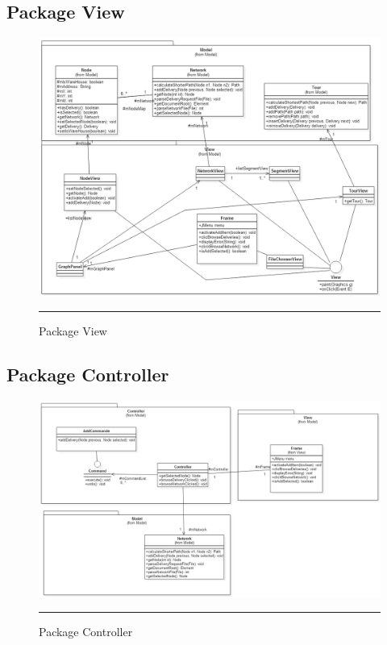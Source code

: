 \subsection{Package View}
\begin{figure}[H]
	\centering
		\includegraphics[width=\textwidth,height=\textheight,keepaspectratio, angle=90]{Figures/vue}
		\rule{35em}{0.5pt}
	\caption[View]{Package View}
\end{figure}
\clearpage
\subsection{Package Controller}
\begin{figure}[H]
	\centering
		\includegraphics[width=\textwidth,height=\textheight,keepaspectratio, angle=90]{Figures/controleur}
		\rule{35em}{0.5pt}
	\caption[Controller]{Package Controller}
\end{figure}

